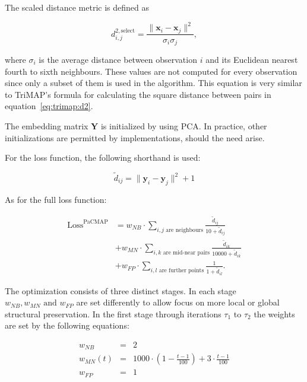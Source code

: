 The scaled distance metric is defined as

\begin{equation}
	\label{eq:pacmap:dselect}
	d^{2,\textrm{select}}_{i,j}=\frac{\|\mathbf{x}_{i}-\mathbf{x}_{j}\|^2}{\sigma_i \sigma_j},
\end{equation}

where $\sigma_i$ is the average distance between observation $i$ and its Euclidean nearest fourth to sixth neighbours. These values are not computed for every observation since only a subset of them is used in the algorithm. This equation is very similar to TriMAP's formula for calculating the square distance between pairs in equation~\eqref{eq:trimap:d2}.

The embedding matrix $\mathbf{Y}$ is initialized by using PCA. In practice, other initializations are permitted by implementations, should the need arise.

For the loss function, the following shorthand is used:

\begin{equation}
	\tilde{d}_{ij} = \|\mathbf{y}_i-\mathbf{y}_j\|^2+1
\end{equation}

As for the full loss function:

\begin{equation}
	\begin{aligned}
		\textrm{Loss}^{\textrm{PaCMAP}} &=
		w_{NB}\cdot\sum_{i,j \text{ are neighbours}}\frac{\tilde{d}_{ij}}{10 + \tilde{d}_{ij}} \\
		& + w_{MN}\cdot\sum_{i,k \text{ are mid-near pairs}}\frac{\tilde{d}_{ik}}{10000 + \tilde{d}_{ik}} \\
		& + w_{FP}\cdot\sum_{i,l \text{ are further points}}\frac{1}{1 + \tilde{d}_{il}}.
	\end{aligned}
\end{equation}

The optimization consists of three distinct stages. In each stage $w_{NB}, w_{MN} \textrm{ and } w_{FP}$ are set differently to allow focus on more local or global structural preservation. In the first stage through iterations $\tau_1$ to $\tau_2$ the weights are set by the following equations:

\begin{equation}
	\begin{aligned}
		w_{NB} & = & 2 \\
		w_{MN}(t) & = & 1000\cdot\left( 1-\frac{t-1}{100} \right) + 3\cdot \frac{t-1}{100} \\
		w_{FP} & = & 1
	\end{aligned}
\end{equation}

